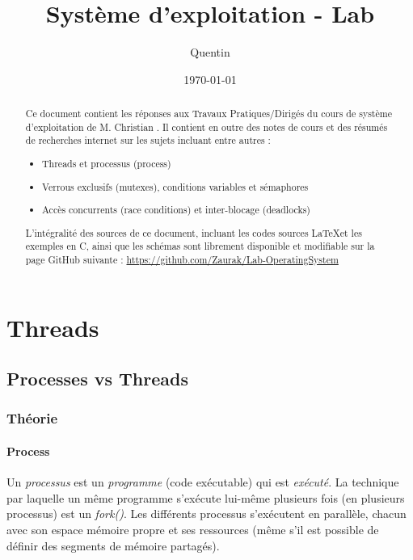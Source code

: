 \documentclass[a4paper, 12pt]{article}
\begin{document}
 
\title{Système d'exploitation - Lab}
\author{Quentin }

\date{\today} 
 
\maketitle
\vfill
\begin{abstract}
	Ce document contient les réponses aux Travaux Pratiques/Dirigés du cours de système d'exploitation de M. Christian . Il contient en outre des notes de cours et des résumés de recherches internet sur les sujets incluant entre autres :
	\begin{itemize}
        \item Threads et processus (process)
        \item Verrous exclusifs (mutexes), conditions variables et sémaphores
        \item Accès concurrents (race conditions) et inter-blocage (deadlocks)
	\end{itemize}
	\bigskip
	L'intégralité des sources de ce document, incluant les codes sources \LaTeX et les exemples en C, ainsi que les schémas sont librement disponible et modifiable sur la page GitHub suivante :	
	\url{https://github.com/Zaurak/Lab-OperatingSystem}
\end{abstract}
\vfill
\newpage

\tableofcontents
\newpage


\section{Threads}

\subsection{Processes vs Threads}

\subsubsection{Théorie}

\paragraph{Process\\}
Un \emph{processus} est un \emph{programme} (code exécutable) qui est \emph{exécuté}. La technique par laquelle un même programme s'exécute lui-même plusieurs fois (en plusieurs processus) est un \emph{fork()}. Les différents processus s'exécutent en parallèle, chacun avec son espace mémoire propre et ses ressources (même s'il est possible de définir des segments de mémoire partagés).
\end{document}
